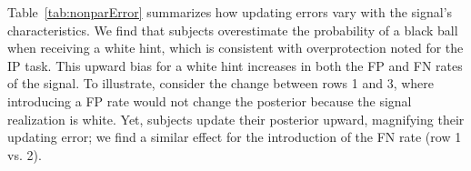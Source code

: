 \documentclass[12pt,a4paper]{article}
\begin{document}
\begin{table}[H]\centering 
\caption{Average Updating Error by Signal Type} 
\label{tab:nonparError}
\end{table}



Table~\ref{tab:nonparError} summarizes how updating errors vary with the signal's characteristics. We find that subjects overestimate the probability of a black ball when receiving a white hint, which is consistent with overprotection noted for the IP task. This upward bias for a white hint increases in both the FP and FN rates of the signal. To illustrate, consider the change between rows 1 and 3, where introducing a FP rate would not change the posterior because the signal realization is white. Yet, subjects update their posterior upward, magnifying their updating error; we find a similar effect for the introduction of the FN rate (row 1 vs. 2).
\end{document}
